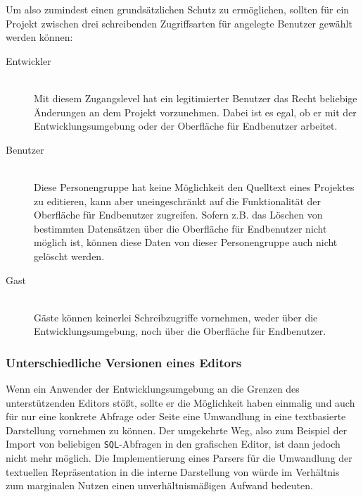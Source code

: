 Um also zumindest einen grundsätzlichen Schutz zu ermöglichen, sollten für ein Projekt zwischen drei schreibenden Zugriffsarten für angelegte Benutzer gewählt werden können:


\begin{description}
  \item[Entwickler] \hfill \\
    Mit diesem Zugangslevel hat ein legitimierter Benutzer das Recht beliebige Änderungen an dem Projekt vorzunehmen. Dabei ist es egal, ob er mit der Entwicklungsumgebung oder der Oberfläche für Endbenutzer arbeitet.
  \item[Benutzer] \hfill \\
    Diese Personengruppe hat keine Möglichkeit den Quelltext eines Projektes zu editieren, kann aber uneingeschränkt auf die Funktionalität der Oberfläche für Endbenutzer zugreifen. Sofern z.B. das Löschen von bestimmten Datensätzen über die Oberfläche für Endbenutzer nicht möglich ist, können diese Daten von dieser Personengruppe auch nicht gelöscht werden.
  \item[Gast] \hfill \\
    Gäste können keinerlei Schreibzugriffe vornehmen, weder über die Entwicklungsumgebung, noch über die Oberfläche für Endbenutzer.
\end{description}

\subsubsection{Unterschiedliche Versionen eines Editors}
\label{sec:editor-different-versions}

Wenn ein Anwender der Entwicklungsumgebung an die Grenzen des unterstützenden Editors stößt, sollte er die Möglichkeit haben einmalig und auch für nur eine konkrete Abfrage oder Seite eine Umwandlung in eine textbasierte Darstellung vornehmen zu können. Der umgekehrte Weg, also zum Beispiel der Import von beliebigen \texttt{SQL}-Abfragen in den grafischen Editor, ist dann jedoch nicht mehr möglich. Die Implementierung eines Parsers für die Umwandlung der textuellen Repräsentation in die interne Darstellung von \idename{} würde im Verhältnis zum marginalen Nutzen einen unverhältnismäßigen Aufwand bedeuten.

